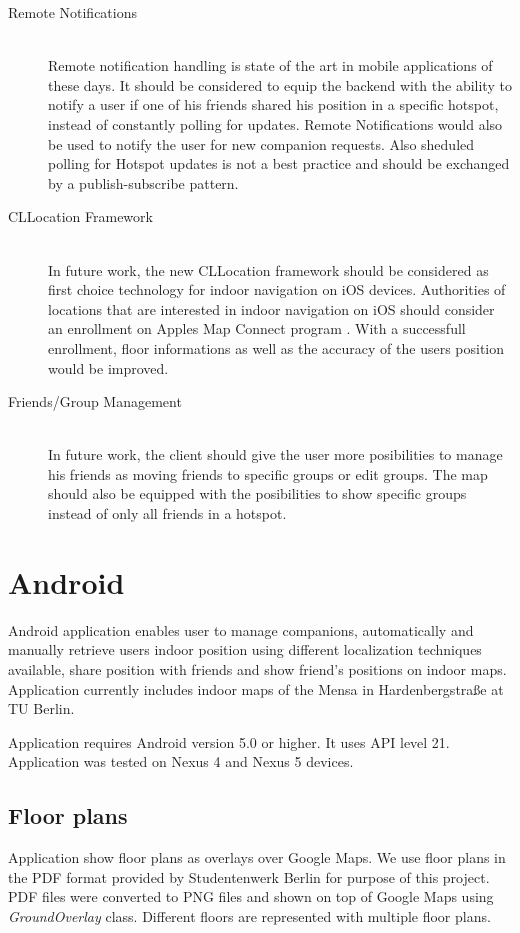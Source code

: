 \begin{description}
  \item[Remote Notifications] \hfill \\
  Remote notification handling is state of the art in mobile applications of these days. It should be considered to equip the backend with the ability to notify a user if one of his friends shared his position in a specific hotspot, instead of constantly polling for updates. Remote Notifications would also be used to notify the user for new companion requests. Also sheduled polling for Hotspot updates is not a best practice and should be exchanged by a publish-subscribe pattern.
  \item[CLLocation Framework] \hfill \\
  In future work, the new CLLocation framework should be considered as first choice technology for indoor navigation on iOS devices. Authorities of locations that are interested in indoor navigation on iOS should consider an enrollment on Apples Map Connect program \cite{MapsConnect}. With a successfull enrollment, floor informations as well as the accuracy of the users position would be improved.
  \item[Friends/Group Management] \hfill \\
  In future work, the client should give the user more posibilities to manage his friends as moving friends to specific groups or edit groups. The map should also be equipped with the posibilities to show specific groups instead of only all friends in a hotspot.

\end{description}

\vspace{0.5cm}

\section{Android}

Android application enables user to manage companions, automatically and manually retrieve users indoor position using different localization techniques available, share position with friends and show friend's positions on indoor maps. Application currently includes indoor maps of the Mensa in Hardenbergstraße at TU Berlin.

Application requires Android version 5.0 or higher. It uses API level 21. Application was tested on Nexus 4 and Nexus 5 devices.

\subsection{Floor plans}
Application show floor plans as overlays over Google Maps. We use floor plans in the PDF format provided by Studentenwerk Berlin for purpose of this project. PDF files were converted to PNG files and shown on top of Google Maps using \textit{GroundOverlay} class. Different floors are represented with multiple floor plans.

